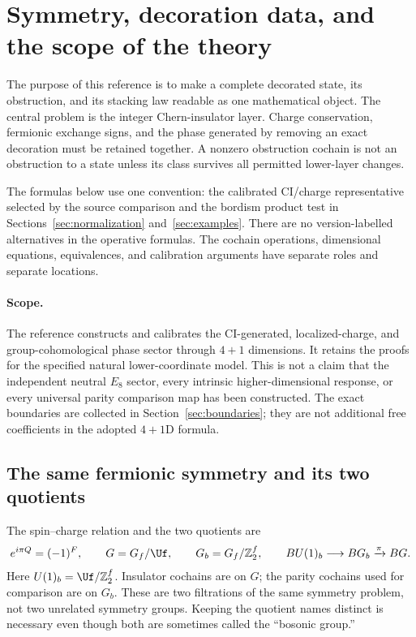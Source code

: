 \section{Symmetry, decoration data, and the scope of the theory}\label{sec:scope}
The purpose of this reference is to make a complete decorated state, its obstruction, and its stacking law readable as one mathematical object. The central problem is the integer Chern-insulator layer. Charge conservation, fermionic exchange signs, and the phase generated by removing an exact decoration must be retained together. A nonzero obstruction cochain is not an obstruction to a state unless its class survives all permitted lower-layer changes.

The formulas below use one convention: the calibrated CI/charge representative selected by the source comparison and the bordism product test in Sections~\ref{sec:normalization} and~\ref{sec:examples}. There are no version-labelled alternatives in the operative formulas. The cochain operations, dimensional equations, equivalences, and calibration arguments have separate roles and separate locations.

\paragraph{Scope.}
The reference constructs and calibrates the CI-generated, localized-charge, and group-cohomological phase sector through $4+1$ dimensions. It retains the proofs for the specified natural lower-coordinate model. This is not a claim that the independent neutral $E_8$ sector, every intrinsic higher-dimensional response, or every universal parity comparison map has been constructed. The exact boundaries are collected in Section~\ref{sec:boundaries}; they are not additional free coefficients in the adopted $4+1$D formula.

\subsection{The same fermionic symmetry and its two quotients}
The spin--charge relation and the two quotients are
\begin{equation}\label{eq:quotients}
 e^{i\pi Q}=(-1)^F,\qquad
 G=G_f/\Uf,\qquad G_b=G_f/\mathbb Z_2^f,
 \qquad BU(1)_b\longrightarrow BG_b\xrightarrow{\pi}BG.
\end{equation}
Here $U(1)_b=\Uf/\mathbb Z_2^f$. Insulator cochains are on $G$; the parity cochains used for comparison are on $G_b$. These are two filtrations of the same symmetry problem, not two unrelated symmetry groups. Keeping the quotient names distinct is necessary even though both are sometimes called the ``bosonic group.''

